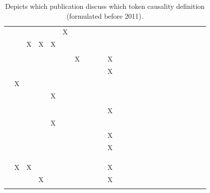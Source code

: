 \documentclass[11pt,a4paper]{book}
\theoremstyle{definition}
\theoremstyle{definition}
\theoremstyle{definition}
\theoremstyle{remark}
\begin{document}
\begin{table}
\begin{tabular}{lp{0.5cm}p{0.5cm}p{0.5cm}p{0.5cm}p{0.5cm}p{0.5cm}p{0.5cm}p{0.5cm}p{0.5cm}p{0.5cm}p{0.5cm}p{0.5cm}p{0.5cm}p{0.5cm}p{0.5cm}p{0.5cm}p{0.5cm}p{0.5cm}p{0.5cm}p{0.5cm}p{0.5cm}p{0.5cm}p{0.5cm}}
 \cite{blanchard2017cause}  	& 	& 	& 	& 	& X	& 	& 	& 	& 	& 	& 	& 	& 	& 	\\
 \cite{wright2017ness}  	& 	& X	& X	& X	& 	& 	& 	& 	& 	& 	& 	& 	& 	& 	\\
 \cite{icard2017normality} 	& 	& 	& 	& 	& 	& 	& 	& 	& 	& 	& 	& 	& 	& 	\\
 \cite{aleksandrowicz2017computational}  	& 	& 	& 	& 	& 	& X	& 	& 	& 	& X	& 	& 	& 	& 	\\
 \cite{fenton2017proposed}  	& 	& 	& 	& 	& 	& 	& 	& 	& 	& X	& 	& 	& 	& 	\\
 \cite{lagnado2017causation}  	& X	& 	& 	& 	& 	& 	& 	& 	& 	& 	& 	& 	& 	& 	\\
 \cite{bochman2018actual}  	& 	& 	& 	& X	& 	& 	& 	& 	& 	& 	& 	& 	& 	& 	\\
 \cite{ibeling2018conditional}  	& 	& 	& 	& 	& 	& 	& 	& 	& 	& 	& 	& 	& 	& 	\\
 \cite{beckers2018principled} 	& 	& 	& 	& 	& 	& 	& 	& 	& 	& X	& 	& 	& 	& 	\\
 \cite{bochman2018laws}  	& 	& 	& 	& X	& 	& 	& 	& 	& 	& 	& 	& 	& 	& 	\\
 \cite{denecker2018causal}  	& 	& 	& 	& 	& 	& 	& 	& 	& 	& X	& 	& 	& 	& 	\\
 \cite{batusov2018situation}  	& 	& 	& 	& 	& 	& 	& 	& 	& 	& X	& 	& 	& 	& 	\\
 \cite{denecker2019explaining}  	& 	& 	& 	& 	& 	& 	& 	& 	& 	& 	& 	& 	& 	& 	\\
 \cite{liepicna2019evaluation}  	& 	& 	& 	& 	& 	& 	& 	& 	& 	& 	& 	& 	& 	& 	\\
 \cite{leblanc2019explaining} 	& 	& 	& 	& 	& 	& 	& 	& 	& 	& 	& 	& 	& 	& 	\\
 \cite{liepicna2020arguing} 	& X	& X	& 	& 	& 	& 	& 	& 	& 	& X	& 	& 	& 	& 	\\
 \cite{khannecessary}  	& 	& 	& X	& 	& 	& 	& 	& 	& 	& X	& 	& 	& 	& 	\\
 \cite{ibeling2020probabilistic}  	& 	& 	& 	& 	& 	& 	& 	& 	& 	& 	& 	& 	& 	& 	\\

\bottomrule
\end{tabular}
\caption{Depicts which publication discuss which token causality definition (formulated before 2011).  }
\label{tab:language}
\end{table}
\end{document}
